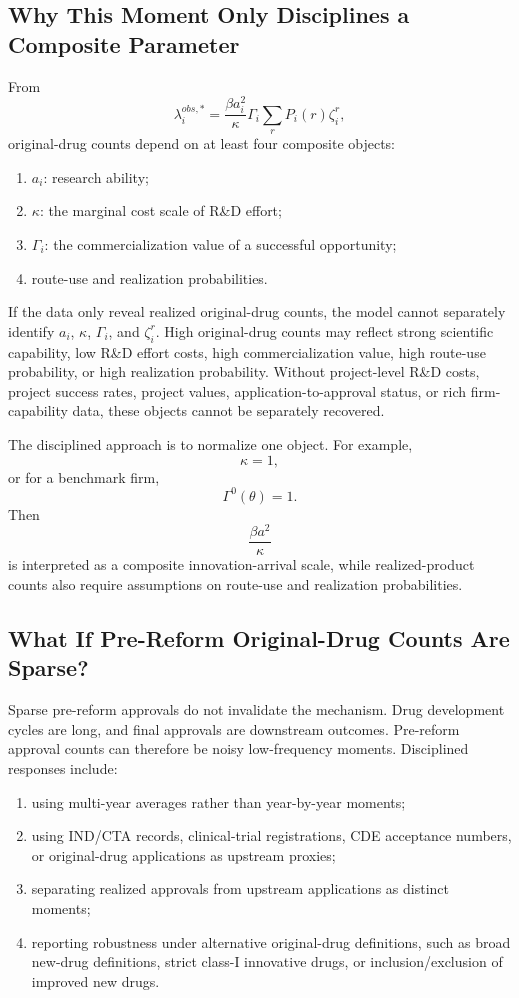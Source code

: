 \documentclass[12pt]{article}
\newcommand{\1}{\mathbf{1}}
\begin{document}
\subsection{Why This Moment Only Disciplines a Composite Parameter}

From
\[
    \lambda_i^{obs,*}=
    \frac{\beta a_i^2}{\kappa}\Gamma_i
    \sum_rP_i(r)\zeta_i^r,
\]
original-drug counts depend on at least four composite objects:
\begin{enumerate}[label=(\roman*),leftmargin=2em]
    \item $a_i$: research ability;
    \item $\kappa$: the marginal cost scale of R\&D effort;
    \item $\Gamma_i$: the commercialization value of a successful opportunity;
    \item route-use and realization probabilities.
\end{enumerate}

If the data only reveal realized original-drug counts, the model cannot separately identify $a_i$, $\kappa$, $\Gamma_i$, and $\zeta_i^r$. High original-drug counts may reflect strong scientific capability, low R\&D effort costs, high commercialization value, high route-use probability, or high realization probability. Without project-level R\&D costs, project success rates, project values, application-to-approval status, or rich firm-capability data, these objects cannot be separately recovered.

The disciplined approach is to normalize one object. For example,
\[
    \kappa=1,
\]
or for a benchmark firm,
\[
    \Gamma^0(\theta)=1.
\]
Then
\[
    \frac{\beta a^2}{\kappa}
\]
is interpreted as a composite innovation-arrival scale, while realized-product counts also require assumptions on route-use and realization probabilities.

\subsection{What If Pre-Reform Original-Drug Counts Are Sparse?}

Sparse pre-reform approvals do not invalidate the mechanism. Drug development cycles are long, and final approvals are downstream outcomes. Pre-reform approval counts can therefore be noisy low-frequency moments. Disciplined responses include:
\begin{enumerate}[leftmargin=2em]
    \item using multi-year averages rather than year-by-year moments;
    \item using IND/CTA records, clinical-trial registrations, CDE acceptance numbers, or original-drug applications as upstream proxies;
    \item separating realized approvals from upstream applications as distinct moments;
    \item reporting robustness under alternative original-drug definitions, such as broad new-drug definitions, strict class-I innovative drugs, or inclusion/exclusion of improved new drugs.
\end{enumerate}
\end{document}
